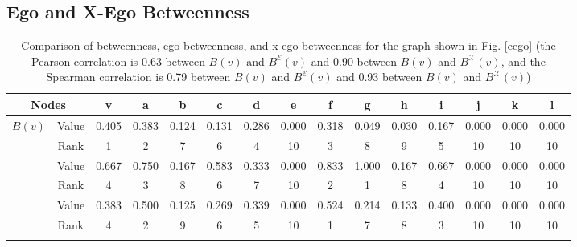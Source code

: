 \documentclass[preprint,12pt,authoryear]{elsarticle}
\newcommand{\B}[1]{B({#1})}
\newcommand{\BE}[1]{B^{\mathcal{E}}({#1})}
\newcommand{\BX}[1]{B^{\mathcal{X}}({#1})}
\theoremstyle{definition}
\begin{document}

\subsection{Ego and X-Ego Betweenness}\label{betweenness}

\begin{center}
\begin{table}[t]
 \caption{Comparison of betweenness, ego betweenness, and x-ego betweenness for the graph shown in Fig. \ref{eego} (the Pearson correlation is 0.63 between $\B{v}$ and $\BE{v}$ and 0.90 between $\B{v}$ and $\BX{v}$, and the Spearman correlation is 0.79 between $\B{v}$ and $\BE{v}$ and 0.93 between $\B{v}$ and $\BX{v}$)}\label{comparison}
 \resizebox{17.4cm}{!} {
 \begin{tabular}{|c|c|c|c|c|c|c|c|c|c|c|c|c|c|c|}
 \hline
\multicolumn{2}{|c|}{Nodes} & v & a & b & c & d & e & f & g & h & i & j & k & l \\
 \hline
\multirow{2}{*}{$\B{v}$} & Value & 0.405 & 0.383 & 0.124 & 0.131 & 0.286 & 0.000 & 0.318 & 0.049 & 0.030 & 0.167 & 0.000 & 0.000 & 0.000\\
\hhline{~--------------}
& Rank & 1 & 2 & 7 & 6 & 4 & 10 & 3 & 8 & 9 & 5 & 10 & 10 & 10\\
\hhline{---------------}
\multirow{2}{*}{$\BE{v}$} & Value & 0.667 & 0.750 & 0.167 & 0.583 & 0.333 & 0.000 & 0.833 & 1.000 & 0.167 & 0.667 & 0.000 & 0.000 & 0.000\\
\hhline{~--------------}
& Rank & 4 & 3 & 8 & 6 & 7 & 10 & 2 & 1 & 8 & 4 & 10 & 10 & 10\\
\hhline{---------------}
\multirow{2}{*}{$\BX{v}$} & Value & 0.383 & 0.500 & 0.125 & 0.269 & 0.339 & 0.000 & 0.524 & 0.214 & 0.133 & 0.400 & 0.000 & 0.000 & 0.000\\
\hhline{~--------------}
& Rank & 4 & 2 & 9 & 6 & 5 & 10 & 1 & 7 & 8 & 3 & 10 & 10 & 10\\
\hhline{---------------}
 \hline
 \end{tabular}
}
\end{table}
\end{center}
\end{document}
